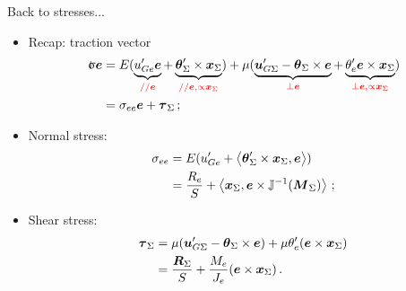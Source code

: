 \begin{frame}{Back to stresses...}{}

\begin{itemize}
\item Recap: traction vector
\begin{displaymath}
\begin{split}
\stress\ev &=E(\underbrace{\uj_{Ge}'\ev}_{\color{red}{//\ev}}+\underbrace{\drot_\Sigma'\times\xv_\Sigma}_{\color{red}{//\ev,\propto\xv_\Sigma}})+\mu(\underbrace{\uv_{G\Sigma}'-\drot_\Sigma\times\ev}_{\color{red}{\perp\ev}}+\underbrace{\drotj_e'\ev\times\xv_\Sigma}_{\color{red}{\perp\ev,\propto\xv_\Sigma}}) \\
&=\stressj_{ee}\ev+\tress_\Sigma\,;
\end{split}
\end{displaymath}
\item Normal stress:
\begin{displaymath}
\begin{split}
\sigma_{ee} &=E(u_{Ge}'+\left\langle{{\boldsymbol{\theta}}_\Sigma'\times{\boldsymbol{x}}_\Sigma,{\boldsymbol{e}}}\right\rangle) \\
&=\frac{R_e}{S}+\left\langle{{\boldsymbol{x}}_\Sigma,{\boldsymbol{e}}\times{\mathbb{J}}^{-1}({\boldsymbol{M}}_\Sigma)}\right\rangle\,;
\end{split}
\end{displaymath}
\item Shear stress:
\begin{displaymath}
\begin{split}
{\boldsymbol{\tau}}_\Sigma &= \mu({\boldsymbol{u}}_{G\Sigma}'-{\boldsymbol{\theta}}_\Sigma\times{\boldsymbol{e}})+\mu\theta_e'({\boldsymbol{e}}\times{\boldsymbol{x}}_\Sigma)\\
&=\frac{{\boldsymbol{R}}_\Sigma}{S}+\frac{M_e}{J_e}({\boldsymbol{e}}\times{\boldsymbol{x}}_\Sigma)\,.
\end{split}
\end{displaymath}
\end{itemize}

\end{frame}

